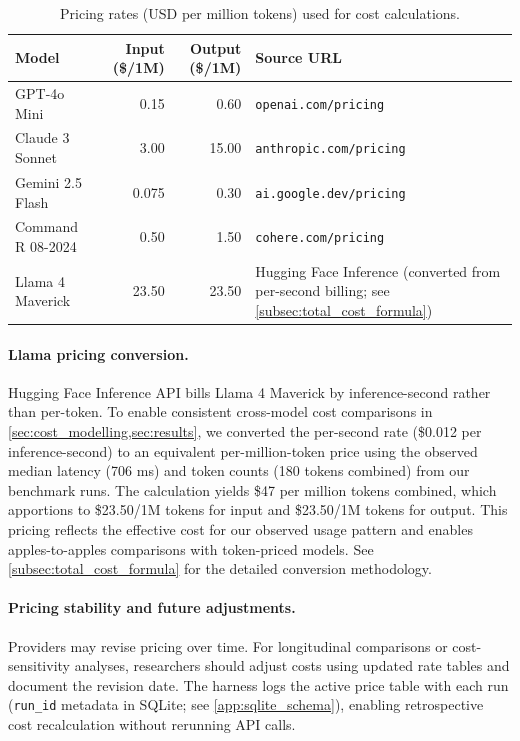 \begin{table}[h!]
\centering
\caption{Pricing rates (USD per million tokens) used for cost calculations.\label{tab:pricing_metadata}}
\begin{tabularx}{\textwidth}{@{}l r r X@{}}
\toprule
\textbf{Model} & \textbf{Input (\$/1M)} & \textbf{Output (\$/1M)} & \textbf{Source URL} \\
\midrule
GPT-4o Mini & 0.15 & 0.60 & \texttt{openai.com/pricing} \\
Claude 3 Sonnet & 3.00 & 15.00 & \texttt{anthropic.com/pricing} \\
Gemini 2.5 Flash & 0.075 & 0.30 & \texttt{ai.google.dev/pricing} \\
Command R 08-2024 & 0.50 & 1.50 & \texttt{cohere.com/pricing} \\
Llama 4 Maverick & 23.50 & 23.50 & Hugging Face Inference (converted from per-second billing; see \cref{subsec:total_cost_formula}) \\
\bottomrule
\end{tabularx}
\end{table}

\paragraph{Llama pricing conversion.} Hugging Face Inference API bills Llama 4 Maverick by inference-second rather than per-token. To enable consistent cross-model cost comparisons in \cref{sec:cost_modelling,sec:results}, we converted the per-second rate (\$0.012 per inference-second) to an equivalent per-million-token price using the observed median latency (706 ms) and token counts (180 tokens combined) from our benchmark runs. The calculation yields \$47 per million tokens combined, which apportions to \$23.50/1M tokens for input and \$23.50/1M tokens for output. This pricing reflects the effective cost for our observed usage pattern and enables apples-to-apples comparisons with token-priced models. See \cref{subsec:total_cost_formula} for the detailed conversion methodology.

\paragraph{Pricing stability and future adjustments.} Providers may revise pricing over time. For longitudinal comparisons or cost-sensitivity analyses, researchers should adjust costs using updated rate tables and document the revision date. The harness logs the active price table with each run (\texttt{run\_id} metadata in SQLite; see \cref{app:sqlite_schema}), enabling retrospective cost recalculation without rerunning API calls.

